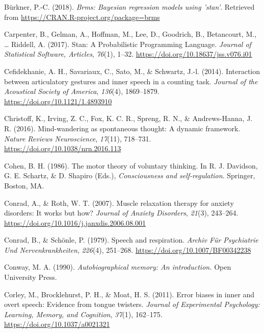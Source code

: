 \documentclass[a4paper,12pt,twoside,openright,oldfontcommands]{memoir}
\begin{document}
\hypertarget{ref-R-brms}{}
Bürkner, P.-C. (2018). \emph{Brms: Bayesian regression models using
'stan'}. Retrieved from \url{https://CRAN.R-project.org/package=brms}

\hypertarget{ref-carpenter_stan:_2017}{}
Carpenter, B., Gelman, A., Hoffman, M., Lee, D., Goodrich, B.,
Betancourt, M., \ldots{} Riddell, A. (2017). Stan: A Probabilistic
Programming Language. \emph{Journal of Statistical Software, Articles},
\emph{76}(1), 1--32. \url{https://doi.org/10.18637/jss.v076.i01}

\hypertarget{ref-cefidekhanie_interaction_2014}{}
Cefidekhanie, A. H., Savariaux, C., Sato, M., \& Schwartz, J.-l. (2014).
Interaction between articulatory gestures and inner speech in a counting
task. \emph{Journal of the Acoustical Society of America},
\emph{136}(4), 1869--1879. \url{https://doi.org/10.1121/1.4893910}

\hypertarget{ref-christoff_mind-wandering_2016}{}
Christoff, K., Irving, Z. C., Fox, K. C. R., Spreng, R. N., \&
Andrews-Hanna, J. R. (2016). Mind-wandering as spontaneous thought: A
dynamic framework. \emph{Nature Reviews Neuroscience}, \emph{17}(11),
718--731. \url{https://doi.org/10.1038/nrn.2016.113}

\hypertarget{ref-cohen_motor_1986}{}
Cohen, B. H. (1986). The motor theory of voluntary thinking. In R. J.
Davidson, G. E. Schartz, \& D. Shapiro (Eds.), \emph{Consciousness and
self-regulation}. Springer, Boston, MA.

\hypertarget{ref-conrad_muscle_2007}{}
Conrad, A., \& Roth, W. T. (2007). Muscle relaxation therapy for anxiety
disorders: It works but how? \emph{Journal of Anxiety Disorders},
\emph{21}(3), 243--264.
\url{https://doi.org/10.1016/j.janxdis.2006.08.001}

\hypertarget{ref-conrad_speech_1979}{}
Conrad, B., \& Schönle, P. (1979). Speech and respiration. \emph{Archiv
Für Psychiatrie Und Nervenkrankheiten}, \emph{226}(4), 251--268.
\url{https://doi.org/10.1007/BF00342238}

\hypertarget{ref-conway_autobiographical_1990}{}
Conway, M. A. (1990). \emph{Autobiographical memory: An introduction.}
Open University Press.

\hypertarget{ref-corley_error_2011}{}
Corley, M., Brocklehurst, P. H., \& Moat, H. S. (2011). Error biases in
inner and overt speech: Evidence from tongue twisters. \emph{Journal of
Experimental Psychology: Learning, Memory, and Cognition}, \emph{37}(1),
162--175. \url{https://doi.org/10.1037/a0021321}
\end{document}
